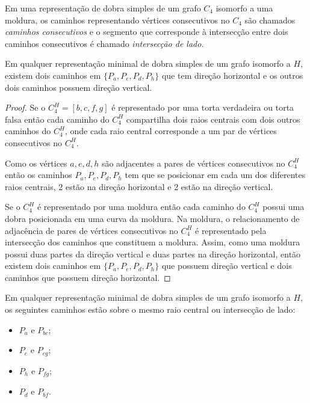 \begin{definition}
Em uma representação de dobra simples de um grafo  $C_4$ isomorfo a uma moldura, os caminhos representando vértices consecutivos no  $C_4$ são chamados \emph{caminhos consecutivos} e o segmento que corresponde à intersecção entre dois caminhos consecutivos é chamado \emph{intersecção de lado}.  
\end{definition}

\begin{lema}\label{lem:2vertical2horizontal}
Em qualquer representação minimal de dobra simples de um grafo isomorfo a $H$, existem dois caminhos em   $\{P_a, P_e, P_d, P_h \}$ que tem direção horizontal e os outros dois caminhos possuem direção vertical.
\end{lema}

\begin{proof}
Se o $C_4^{H} = [b,c,f,g]$ é representado por uma torta verdadeira ou torta falsa então cada caminho do  $C_4^{H}$ compartilha dois raios centrais com dois outros caminhos do  $C_4^{H}$, onde cada raio central corresponde a um par de vértices consecutivos no $C_4^{H}$.

Como os vértices  $a, e, d, h$ são adjacentes a pares de vértices consecutivos no $C_4^{H}$ então os caminhos $P_a, P_e, P_d, P_h$ tem que se posicionar em cada um dos diferentes raios centrais,  2 estão na direção horizontal e 2 estão na direção vertical.

Se o $C_4^{H}$ é representado por uma moldura então cada caminho do $C_4^{H}$ possui uma dobra posicionada em uma curva da moldura. Na moldura, o relacionamento de adjacência de pares de vértices consecutivos no $C_4^{H}$ é representado pela intersecção dos caminhos que constituem a moldura. Assim, como uma moldura possui duas partes da direção vertical e duas partes na direção horizontal, então existem dois caminhos em $\{P_a, P_e, P_d, P_h\}$ que possuem direção vertical e dois caminhos que possuem direção horizontal.
 \end{proof}

\begin{corollary}
 \label{coro:paresMesmoSegmento}
Em qualquer representação minimal de dobra simples de um grafo isomorfo a $H$, os seguintes caminhos estão sobre o mesmo raio central ou intersecção de lado: %

\begin{itemize}
\item $P_a$ e $P_{bc}$;
\item $P_e$ e $P_{cg}$;
\item $P_h$ e $P_{fg}$;
\item $P_d$ e $P_{bf}$.
\end{itemize}
\end{corollary}


